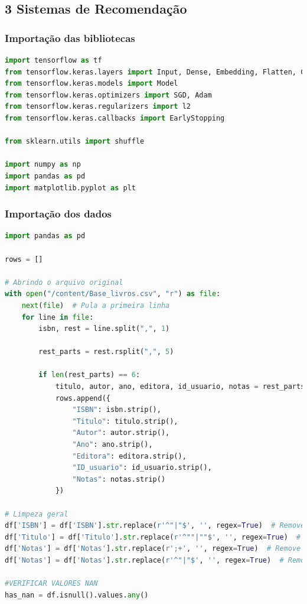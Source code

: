\subsection*{\textbf{3 Sistemas de Recomendação}}
\subsubsection*{Importação das bibliotecas}
\begin{lstlisting}[language=Python, style=input]
import tensorflow as tf
from tensorflow.keras.layers import Input, Dense, Embedding, Flatten, Concatenate, Dropout, Layer
from tensorflow.keras.models import Model
from tensorflow.keras.optimizers import SGD, Adam
from tensorflow.keras.regularizers import l2
from tensorflow.keras.callbacks import EarlyStopping

from sklearn.utils import shuffle

import numpy as np
import pandas as pd
import matplotlib.pyplot as plt
\end{lstlisting}
\subsubsection*{Importação dos dados}
\begin{lstlisting}[language=Python, style=input]
import pandas as pd

rows = []

# Abrindo o arquivo original
with open("/content/Base_livros.csv", "r") as file:
    next(file)  # Pula a primeira linha
    for line in file:
        isbn, rest = line.split(",", 1)

        rest_parts = rest.rsplit(",", 5)

        if len(rest_parts) == 6:
            titulo, autor, ano, editora, id_usuario, notas = rest_parts
            rows.append({
                "ISBN": isbn.strip(),
                "Titulo": titulo.strip(),
                "Autor": autor.strip(),
                "Ano": ano.strip(),
                "Editora": editora.strip(),
                "ID_usuario": id_usuario.strip(),
                "Notas": notas.strip()
            })

# Limpeza geral
df['ISBN'] = df['ISBN'].str.replace(r'^"|"$', '', regex=True)  # Remove aspas extras no início e fim
df['Titulo'] = df['Titulo'].str.replace(r'^""|""$', '', regex=True)  # Remove aspas ao redor do título
df['Notas'] = df['Notas'].str.replace(r';+', '', regex=True)  # Remove os ';' extras nas notas
df['Notas'] = df['Notas'].str.replace(r'^"|"$', '', regex=True)  # Remove aspas ao redor

#VERIFICAR VALORES NAN
has_nan = df.isnull().values.any()
\end{lstlisting}
